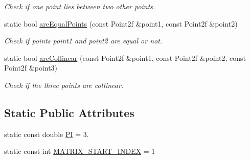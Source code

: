 \begin{DoxyCompactItemize}
\begin{DoxyCompactList}\small\item\em \-Check if one point lies between two other points. \end{DoxyCompactList}\item 
static bool \hyperlink{classmultiscale_1_1Geometry2D_aa2d3ac595072b9ab61879a44629d7969}{are\-Equal\-Points} (const \-Point2f \&point1, const \-Point2f \&point2)
\begin{DoxyCompactList}\small\item\em \-Check if points point1 and point2 are equal or not. \end{DoxyCompactList}\item 
static bool \hyperlink{classmultiscale_1_1Geometry2D_aa8b75808a35a471becae0ad99e708bdd}{are\-Collinear} (const \-Point2f \&point1, const \-Point2f \&point2, const \-Point2f \&point3)
\begin{DoxyCompactList}\small\item\em \-Check if the three points are collinear. \end{DoxyCompactList}\end{DoxyCompactItemize}
\subsection*{\-Static \-Public \-Attributes}
\begin{DoxyCompactItemize}
\item 
static const double \hyperlink{classmultiscale_1_1Geometry2D_a7039b8bbe89283e22744c0631d597660}{\-P\-I} = 3.
\item 
static const int \hyperlink{classmultiscale_1_1Geometry2D_ade1d55d3ef110b73d42a3e4c4360ba17}{\-M\-A\-T\-R\-I\-X\-\_\-\-S\-T\-A\-R\-T\-\_\-\-I\-N\-D\-E\-X} = 1
\end{DoxyCompactItemize}
